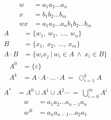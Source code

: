 \documentclass[10pt,a4paper,oneside]{book}
\begin{document}
	\begin{align*}
	w  &= a_1 a_2 \dots a_n\\
	x  &= b_1 b_2 \dots b_m\\
	wx &= a_1 a_2 \dots a_n b_1 b_2 \dots b_m
	\end{align*}
	\begin{align*} 
	A & = \{ w_1 ,\ w_2 ,\ \dots ,\ w_n \} \\ 
	B & = \{ x_1 ,\ x_2 ,\ \dots ,\ x_m \} \\ 
	A \cdot B & = \{ w_ix_j \ | \ w_i \in A \ \wedge \ x_i \in B \}
	\end{align*} 
	\begin{align*} 
	A^0 & = \{ \varepsilon \} \\
	A^k & = A \cdot A \cdot \ldots \cdot A \ = \ \bigcirc_{i=1}^{k} A \\
	\end{align*}
	\begin{align*} 
	A^* &= A^0 \cup A^1 \cup A^2 \cdots  \ = \ \bigcup_{i=0}^{ \infty } A^i
	\end{align*} 		
	\begin{align*}
	w  &= a_1 a_2 \dots a_{n-1} a_n\\
	w^R  &= a_n a_{n-1} \dots a_2 a_1\\
	\end{align*}
\end{document}
